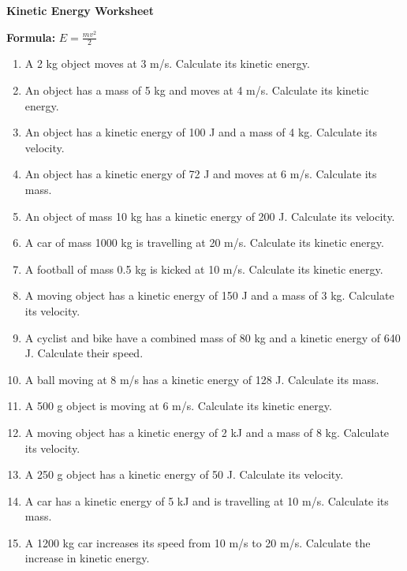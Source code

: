 \documentclass[12pt]{article}
\begin{document}
\begin{center}
    \Large \textbf{Kinetic Energy Worksheet}
\end{center}

\vspace{0.5cm}

\noindent \textbf{Formula:} \quad $E = \frac{mv^2}{2}$

\vspace{0.5cm}

\begin{enumerate}

\item A 2 kg object moves at 3 m/s. Calculate its kinetic energy.

\item An object has a mass of 5 kg and moves at 4 m/s. Calculate its kinetic energy.

\item An object has a kinetic energy of 100 J and a mass of 4 kg. Calculate its velocity.

\item An object has a kinetic energy of 72 J and moves at 6 m/s. Calculate its mass.

\item An object of mass 10 kg has a kinetic energy of 200 J. Calculate its velocity.

\item A car of mass 1000 kg is travelling at 20 m/s. Calculate its kinetic energy.

\item A football of mass 0.5 kg is kicked at 10 m/s. Calculate its kinetic energy.

\item A moving object has a kinetic energy of 150 J and a mass of 3 kg. Calculate its velocity.

\item A cyclist and bike have a combined mass of 80 kg and a kinetic energy of 640 J. Calculate their speed.

\item A ball moving at 8 m/s has a kinetic energy of 128 J. Calculate its mass.

\item A 500 g object is moving at 6 m/s. Calculate its kinetic energy.

\item A moving object has a kinetic energy of 2 kJ and a mass of 8 kg. Calculate its velocity.

\item A 250 g object has a kinetic energy of 50 J. Calculate its velocity.

\item A car has a kinetic energy of 5 kJ and is travelling at 10 m/s. Calculate its mass.

\item A 1200 kg car increases its speed from 10 m/s to 20 m/s. Calculate the increase in kinetic energy.

\end{enumerate}
\end{document}
